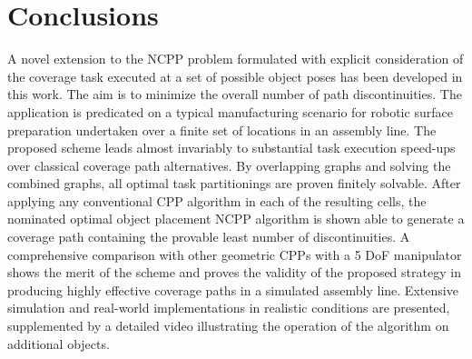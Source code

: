 \documentclass[letterpaper, 10pt, conference]{ieeeconf}
\begin{document}
\section{Conclusions}
\label{sectionconclusion}
A novel extension to the NCPP problem formulated with explicit consideration of the coverage task executed at a set of possible object poses has been developed in this work. 
The aim is to minimize the overall number of path discontinuities.%
The application is predicated on a typical manufacturing scenario for robotic surface preparation undertaken over a finite set of locations in an assembly line. The proposed scheme leads almost invariably to substantial task execution speed-ups over classical coverage path alternatives.%
By overlapping graphs and solving the combined graphs, all optimal task partitionings are proven finitely solvable. 
After applying any conventional CPP algorithm in each of the resulting cells, the nominated optimal object placement NCPP algorithm is shown able to generate a coverage path containing the provable least number of discontinuities. A comprehensive comparison with other geometric CPPs with a 5 DoF manipulator shows the merit of the scheme and proves the validity of the proposed strategy in producing highly effective coverage paths in a simulated assembly line.
Extensive simulation and real-world implementations in realistic conditions are presented, supplemented by a detailed video illustrating the operation of the algorithm on additional objects. 

\newpage

 



%


\end{document}

